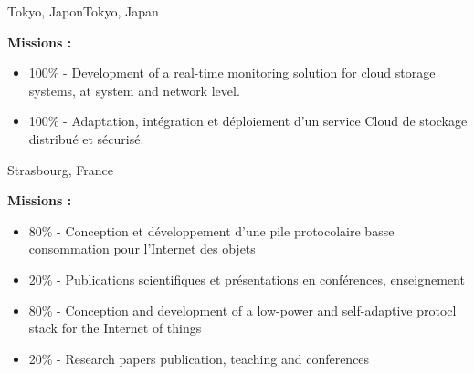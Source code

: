 \vspace{\ItemsSpacing}

{}{}{\ifnativelang Tokyo, Japon\else Tokyo, Japan\fi}{
\textbf{Missions :} 
\begin{itemize}
\ifnativelang
\item 100\% - Development of a real-time monitoring solution for cloud storage systems, at system and network level.
\else
\item 100\% - Adaptation, int\'egration et d\'eploiement d'un service Cloud de stockage distribu\'e et s\'ecuris\'e.
\fi
\end{itemize}
}

\vspace{\ItemsSpacing}

{}{}{Strasbourg, France}{
\textbf{Missions :} 
\begin{itemize}
\ifnativelang
\item 80\% - Conception et d\'eveloppement d'une pile protocolaire basse consommation pour l'Internet des objets
\item 20\% - Publications scientifiques et pr\'esentations en conf\'erences, enseignement
\else
\item 80\% - Conception and development of a low-power and self-adaptive protocl stack for the Internet of things
\item 20\% - Research papers publication, teaching and conferences
\fi
\end{itemize}
}


